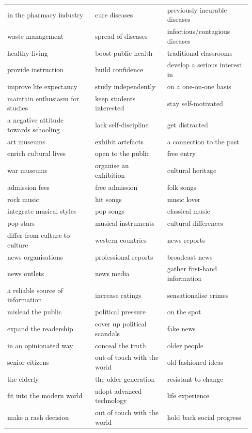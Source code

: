 \documentclass[10pt,a4paper]{article}
\begin{document}
{\begin{longtable}{@{}*{3}{p{}}@{}}
in the pharmacy industry & cure diseases & previously incurable diseases \\
waste management & spread of diseases & infectious/contagious diseases \\
healthy living & boost public health & traditional classrooms \\
provide instruction & build confidence & develop a serious interest in \\
improve life expectancy & study independently & on a one-on-one basis \\
maintain enthusiasm for studies & keep students interested & stay self-motivated \\
a negative attitude towards schooling & lack self-discipline & get distracted \\
art museums & exhibit artefacts & a connection to the past \\
enrich cultural lives & open to the public & free entry \\
war museums & organise an exhibition & cultural heritage \\
admission fees & free admission & folk songs \\
rock music & hit songs & music lover \\
integrate musical styles & pop songs & classical music \\
pop stars & musical instruments & cultural differences \\
differ from culture to culture & western countries & news reports \\
news organisations & professional reports & broadcast news \\
news outlets & news media & gather first-hand information \\
a reliable source of information & increase ratings & sensationalise crimes \\
mislead the public & political pressure & on the spot \\
expand the readership & cover up political scandals & fake news \\
in an opinionated way & conceal the truth & older people \\
senior citizens & out of touch with the world & old-fashioned ideas \\
the elderly & the older generation & resistant to change \\
fit into the modern world & adopt advanced technology & life experience \\
make a rash decision & out of touch with the world & hold back social progress \\

\end{longtable}}
\end{document}
